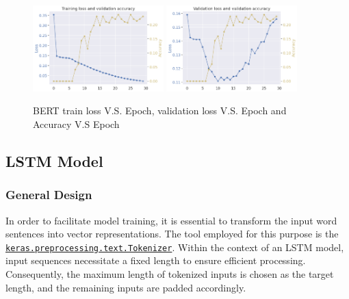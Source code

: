 \documentclass{article}
\begin{document}
\begin{figure}[h!]
    \centering
    \includegraphics[width = 0.45\textwidth]{img/bert_train_plot.png}
    \includegraphics[width = 0.45\textwidth]{img/bert_val_plot.png}
    \caption{BERT train loss V.S. Epoch, validation loss V.S. Epoch and Accuracy V.S Epoch}
    \label{fig:bert_plot}
\end{figure}

\subsection{LSTM Model}
\subsubsection{General Design}

In order to facilitate model training, it is essential to transform the input word sentences into vector representations. The tool employed for this purpose is the \href{https://www.tensorflow.org/api_docs/python/tf/keras/preprocessing/text/Tokenizer}{\texttt{keras.preprocessing.text.Tokenizer}}. Within the context of an LSTM\cite{LSTM} model, input sequences necessitate a fixed length to ensure efficient processing. Consequently, the maximum length of tokenized inputs is chosen as the target length, and the remaining inputs are padded accordingly.
\end{document}
